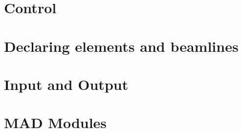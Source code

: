 \documentclass[12pt,a4paper,twoside]{book}
\begin{document}

\tableofcontents

\part{Control}



\part{Declaring elements and beamlines} %

\part{Input and Output}                 %




\part{MAD Modules}                      %
%
%
\end{document}
